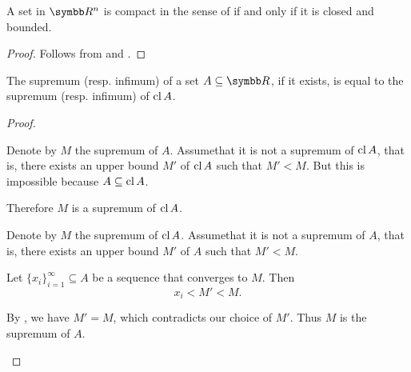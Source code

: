 \begin{theorem}\label{thm:heine_borel}
  A set in \( \BR^n \) is compact in the sense of  if and only if it is closed and bounded.
\end{theorem}
\begin{proof}
  Follows from  and .
\end{proof}

\begin{proposition}\label{thm:real_supremum_of_closure}
  The supremum (resp. infimum) of a set \( A \subseteq \BR \), if it exists, is equal to the supremum (resp. infimum) of \( \operatorname{cl} A \).
\end{proposition}
\begin{proof}\mbox{}
  \begin{description}
    \Implies Denote by \( M \) the supremum of \( A \). Assume\LEM that it is not a supremum of \( \operatorname{cl} A \), that is, there exists an upper bound \( M' \) of \( \operatorname{cl} A \) such that \( M' < M \). But this is impossible because \( A \subseteq \operatorname{cl} A \).

    Therefore \( M \) is a supremum of \( \operatorname{cl} A \).

    \ImpliedBy Denote by \( M \) the supremum of \( \operatorname{cl} A \). Assume\LEM that it is not a supremum of \( A \), that is, there exists an upper bound \( M' \) of \( A \) such that \( M' < M \).

    Let \( \{ x_i \}_{i=1}^\infty \subseteq A \) be a sequence that converges to \( M \). Then
    \begin{equation*}
      x_i < M' < M.
    \end{equation*}

    By , we have \( M' = M \), which contradicts our choice of \( M' \). Thus \( M \) is the supremum of \( A \).
  \end{description}
\end{proof}

